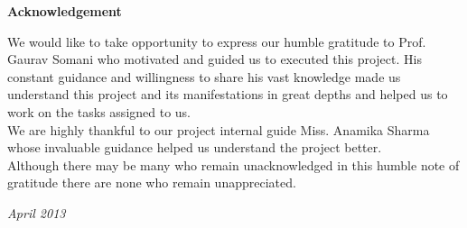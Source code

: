 \newpage
{\bf \LARGE Acknowledgement}
\vspace{3cm}


We would like to take opportunity to express our humble gratitude to Prof. Gaurav Somani who motivated and guided us to executed this project. His constant guidance and willingness to share his vast knowledge made us understand this project and its manifestations in great depths and helped us to work on the tasks assigned to us. \\
 
We are highly thankful to our project internal guide Miss. Anamika Sharma whose invaluable guidance helped us understand the project better. \\

Although there may be many who remain unacknowledged in this humble note of gratitude there are none who remain unappreciated.

\vspace{3cm}
{\it April 2013}
